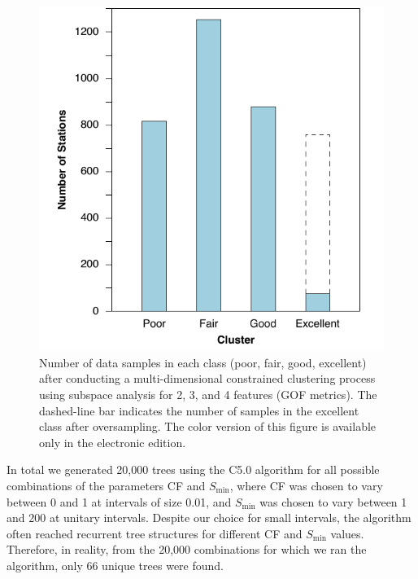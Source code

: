\begin{figure}[t]
	\centering
	\includegraphics[width=\columnwidth]{figures/pdf/figure-07}
	\caption{Number of data samples in each class (poor, fair, good, excellent) after conducting a multi-dimensional constrained \kmeans{} clustering process using subspace analysis for 2, 3, and 4 features (GOF metrics). The dashed-line bar indicates the number of samples in the excellent class after oversampling. The color version of this figure is available only in the electronic edition.}
	\label{fig:count-classes}
\end{figure}

In total we generated 20,000 trees using the C5.0 algorithm for all possible combinations of the parameters CF and $S_{\min}$, where CF was chosen to vary between 0 and 1 at intervals of size 0.01, and $S_{\min}$ was chosen to vary between 1 and 200 at unitary intervals. Despite our choice for small intervals, the algorithm often reached recurrent tree structures for different CF and $S_{\min}$ values. Therefore, in reality, from the 20,000 combinations for which we ran the algorithm, only 66 unique trees were found. 

